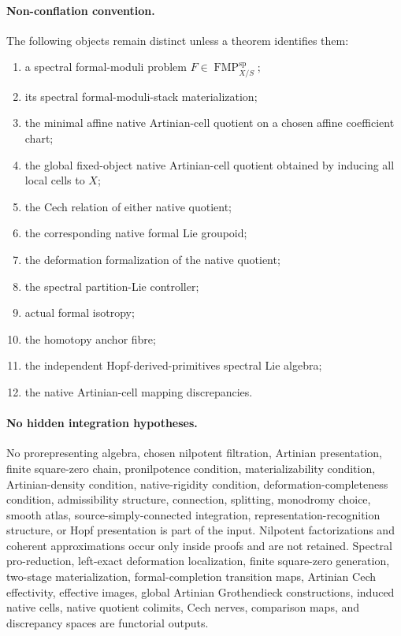 \paragraph{Non-conflation convention.}
The following objects remain distinct unless a theorem identifies them:
\begin{enumerate}
    \item a spectral formal-moduli problem
    $F\in\operatorname{FMP}^{\mathrm{sp}}_{X/S}$;
    \item its spectral formal-moduli-stack materialization;
    \item the minimal affine native Artinian-cell quotient on a chosen affine
    coefficient chart;
    \item the global fixed-object native Artinian-cell quotient obtained by
    inducing all local cells to $X$;
    \item the Cech relation of either native quotient;
    \item the corresponding native formal Lie groupoid;
    \item the deformation formalization of the native quotient;
    \item the spectral partition-Lie controller;
    \item actual formal isotropy;
    \item the homotopy anchor fibre;
    \item the independent Hopf-derived-primitives spectral Lie algebra;
    \item the native Artinian-cell mapping discrepancies.
\end{enumerate}

\paragraph{No hidden integration hypotheses.}
No prorepresenting algebra, chosen nilpotent filtration, Artinian presentation,
finite square-zero chain, pronilpotence condition, materializability condition,
Artinian-density condition, native-rigidity condition, deformation-completeness
condition, admissibility structure, connection, splitting, monodromy choice,
smooth atlas, source-simply-connected integration, representation-recognition
structure, or Hopf presentation is part of the input.  Nilpotent factorizations and coherent
approximations occur only inside proofs and are not retained.  Spectral
pro-reduction, left-exact deformation localization, finite square-zero
generation, two-stage materialization, formal-completion transition maps,
Artinian Cech effectivity, effective images, global Artinian Grothendieck
constructions, induced native cells, native quotient colimits, Cech nerves,
comparison maps, and discrepancy spaces are functorial outputs.

